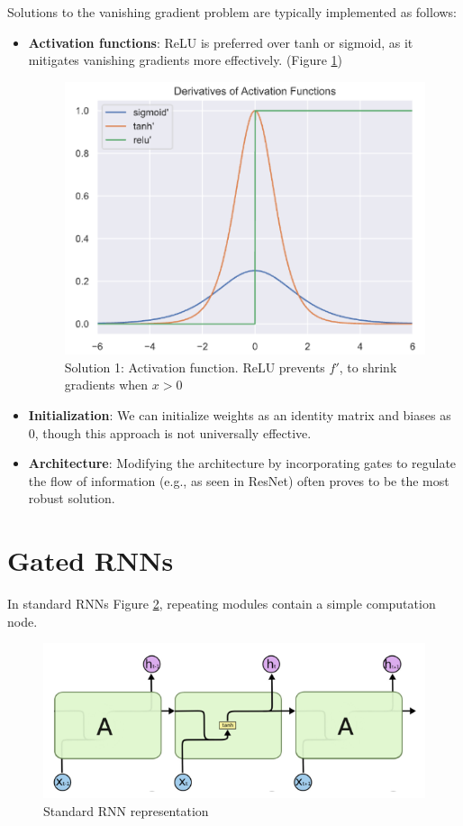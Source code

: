 Solutions to the vanishing gradient problem are typically implemented as follows:
\begin{itemize}
    \item \textbf{Activation functions}: ReLU is preferred over tanh or sigmoid, as it mitigates 
        vanishing gradients more effectively. (Figure \ref{fig:activation})
        \begin{figure}[!ht]
            \centering
            \includegraphics[width=0.5\linewidth]{img/RNN/derivatives.png}
            \caption{Solution 1: Activation function. ReLU prevents $f'$, to shrink gradients when $x > 0$}
            \label{fig:activation}
        \end{figure}
    \item \textbf{Initialization}: We can initialize weights as an identity matrix and biases as 0, 
        though this approach is not universally effective.
    \item \textbf{Architecture}: Modifying the architecture by incorporating gates to regulate the 
        flow of information (e.g., as seen in ResNet) often proves to be the most robust solution.
\end{itemize}
\section{Gated RNNs}
In standard RNNs Figure \ref{fig:sRNN}, repeating modules contain a simple computation node.

\begin{figure}[!ht]
    \centering
    \includegraphics[width=0.5\linewidth]{img/RNN/sRNN.png}
    \caption{Standard RNN representation}
    \label{fig:sRNN}
\end{figure}

